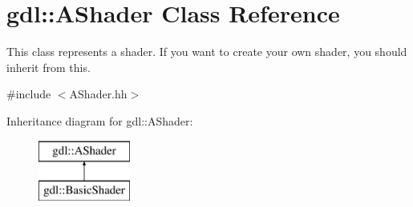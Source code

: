 \hypertarget{classgdl_1_1_a_shader}{\section{gdl\-:\-:A\-Shader Class Reference}
\label{classgdl_1_1_a_shader}
}


This class represents a shader. If you want to create your own shader, you should inherit from this.  




{\ttfamily \#include $<$A\-Shader.\-hh$>$}

Inheritance diagram for gdl\-:\-:A\-Shader\-:\begin{figure}[H]
\begin{center}
\leavevmode
\includegraphics[height=2.000000cm]{classgdl_1_1_a_shader}
\end{center}
\end{figure}
